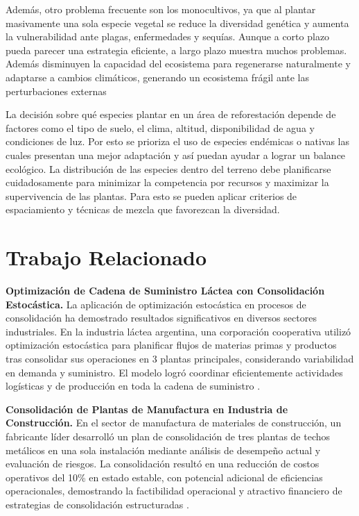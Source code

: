 \documentclass{article}
\begin{document}
Además, otro problema frecuente son los monocultivos, ya que al plantar masivamente una sola especie vegetal se reduce la diversidad genética y aumenta la vulnerabilidad ante plagas, enfermedades y sequías.
Aunque a corto plazo pueda parecer una estrategia eficiente, a largo plazo muestra muchos problemas. Además disminuyen la capacidad del ecosistema para regenerarse naturalmente y adaptarse a cambios climáticos, generando un ecosistema frágil ante las perturbaciones externas \citep{gann2019}

La decisión sobre qué especies plantar en un área de reforestación depende de factores como el tipo de suelo, el clima, altitud, disponibilidad de agua y condiciones de luz.
Por esto se prioriza el uso de especies endémicas o nativas las cuales presentan una mejor adaptación y así puedan ayudar a lograr un balance ecológico.
La distribución de las especies dentro del terreno debe planificarse cuidadosamente para minimizar la competencia por recursos y maximizar la supervivencia de las plantas.
Para esto se pueden aplicar criterios de espaciamiento y técnicas de mezcla que favorezcan la diversidad.


\section*{Trabajo Relacionado}

\textbf{Optimización de Cadena de Suministro Láctea con Consolidación Estocástica.}
La aplicación de optimización estocástica en procesos de consolidación ha demostrado resultados significativos en diversos sectores industriales. En la industria láctea argentina, una corporación cooperativa utilizó optimización estocástica para planificar flujos de materias primas y productos tras consolidar sus operaciones en 3 plantas principales, considerando variabilidad en demanda y suministro. El modelo logró coordinar eficientemente actividades logísticas y de producción en toda la cadena de suministro \citep{dairy_optimization2021}.

\textbf{Consolidación de Plantas de Manufactura en Industria de Construcción.}
En el sector de manufactura de materiales de construcción, un fabricante líder desarrolló un plan de consolidación de tres plantas de techos metálicos en una sola instalación mediante análisis de desempeño actual y evaluación de riesgos. La consolidación resultó en una reducción de costos operativos del 10\% en estado estable, con potencial adicional de eficiencias operacionales, demostrando la factibilidad operacional y atractivo financiero de estrategias de consolidación estructuradas \citep{lek2018}.
\end{document}
